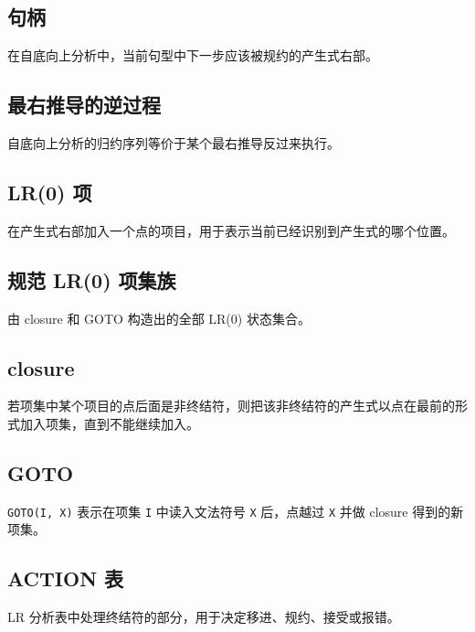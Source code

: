 \documentclass[UTF8,zihao=-4]{ctexart}
\begin{document}
\subsection*{句柄}

在自底向上分析中，当前句型中下一步应该被规约的产生式右部。

\subsection*{最右推导的逆过程}

自底向上分析的归约序列等价于某个最右推导反过来执行。

\subsection*{LR(0) 项}

在产生式右部加入一个点的项目，用于表示当前已经识别到产生式的哪个位置。

\subsection*{规范 LR(0) 项集族}

由 closure 和 GOTO 构造出的全部 LR(0) 状态集合。

\subsection*{closure}

若项集中某个项目的点后面是非终结符，则把该非终结符的产生式以点在最前的形式加入项集，直到不能继续加入。

\subsection*{GOTO}

\texttt{GOTO(I, X)} 表示在项集 \texttt{I} 中读入文法符号 \texttt{X} 后，点越过 \texttt{X} 并做 closure 得到的新项集。

\subsection*{ACTION 表}

LR 分析表中处理终结符的部分，用于决定移进、规约、接受或报错。
\end{document}
